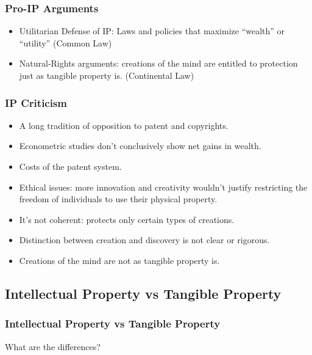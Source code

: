 
\begin{frame}
\frametitle{Pro-IP Arguments}

\begin{itemize}
\item \alert{Utilitarian Defense of IP}: Laws and policies that maximize  ``wealth'' or ``utility'' (Common Law)
\item \alert{Natural-Rights arguments}: creations of the mind are entitled to protection just as tangible property is. (Continental Law)
\end{itemize}

\end{frame}


\begin{frame}
\frametitle{IP Criticism}

\begin{itemize}
\item A long tradition of opposition to patent and copyrights.
\item Econometric studies don't conclusively show net gains in wealth.
\item Costs of the patent system.
\item Ethical issues: more innovation and creativity wouldn't justify restricting the freedom of individuals to use their physical property.
\item It's not coherent: protects only certain types of creations.
\item Distinction between creation and discovery is not clear or rigorous. 
\item Creations of the mind are not as tangible property is.
\end{itemize}

\end{frame}


\subsection{Intellectual Property vs Tangible Property}
\begin{frame}
\frametitle{Intellectual Property vs Tangible Property}

\begin{center}
\Large
What are the differences?
\end{center}

\end{frame}

